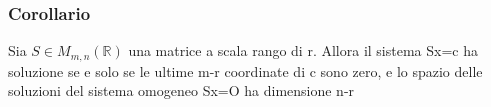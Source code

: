 \documentclass{article}
\begin{document}
\subsubsection{Corollario}
\begin{flushleft}
	Sia $S \in M_{m,n}(\mathbb{R})$ una matrice a scala rango di r. Allora il sistema
	Sx=c ha soluzione se e solo se le ultime m-r coordinate di c sono zero, e lo spazio delle soluzioni
	del sistema omogeneo Sx=O ha dimensione n-r
\end{flushleft}
\end{document}
